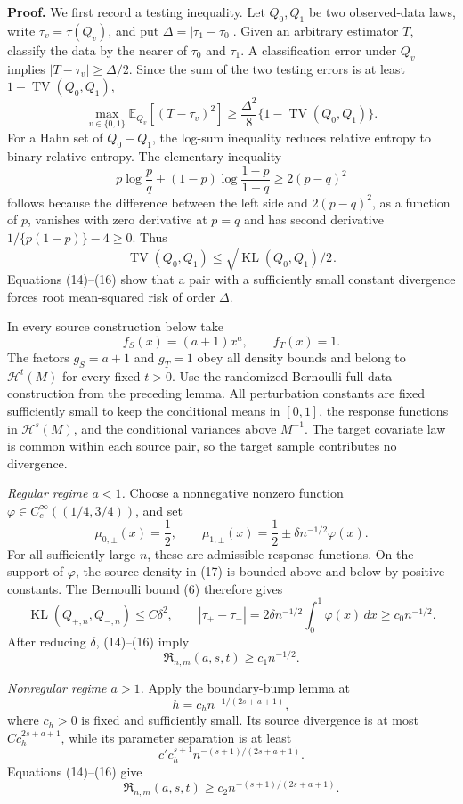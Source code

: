 \textbf{Proof.}
We first record a testing inequality.  Let \(Q_0,Q_1\) be two observed-data laws, write \(\tau_v=\tau(Q_v)\), and put \(\Delta=|\tau_1-\tau_0|\).  Given an arbitrary estimator \(T\), classify the data by the nearer of \(\tau_0\) and \(\tau_1\).  A classification error under \(Q_v\) implies \(|T-\tau_v|\ge\Delta/2\).  Since the sum of the two testing errors is at least \(1-\operatorname{TV}(Q_0,Q_1)\),
\[
\max_{v\in\{0,1\}}\mathbb E_{Q_v}[(T-\tau_v)^2]
\ge \frac{\Delta^2}{8}\{1-\operatorname{TV}(Q_0,Q_1)\}.
\tag{14}
\]
For a Hahn set of \(Q_0-Q_1\), the log-sum inequality reduces relative entropy to binary relative entropy.  The elementary inequality
\[
p\log\frac pq+(1-p)\log\frac{1-p}{1-q}\ge2(p-q)^2
\tag{15}
\]
follows because the difference between the left side and \(2(p-q)^2\), as a function of \(p\), vanishes with zero derivative at \(p=q\) and has second derivative \(1/\{p(1-p)\}-4\ge0\).  Thus
\[
\operatorname{TV}(Q_0,Q_1)
\le\sqrt{\operatorname{KL}(Q_0,Q_1)/2}.
\tag{16}
\]
Equations (14)--(16) show that a pair with a sufficiently small constant divergence forces root mean-squared risk of order \(\Delta\).

In every source construction below take
\[
f_S(x)=(a+1)x^a,
\qquad
f_T(x)=1.
\tag{17}
\]
The factors \(g_S=a+1\) and \(g_T=1\) obey all density bounds and belong to \(\mathcal H^t(M)\) for every fixed \(t>0\).  Use the randomized Bernoulli full-data construction from the preceding lemma.  All perturbation constants are fixed sufficiently small to keep the conditional means in \([0,1]\), the response functions in \(\mathcal H^s(M)\), and the conditional variances above \(M^{-1}\).  The target covariate law is common within each source pair, so the target sample contributes no divergence.

\emph{Regular regime \(a<1\).}
Choose a nonnegative nonzero function \(\varphi\in C_c^\infty((1/4,3/4))\), and set
\[
\mu_{0,\pm}(x)=\frac12,
\qquad
\mu_{1,\pm}(x)=\frac12\pm\delta n^{-1/2}\varphi(x).
\tag{18}
\]
For all sufficiently large \(n\), these are admissible response functions.  On the support of \(\varphi\), the source density in (17) is bounded above and below by positive constants.  The Bernoulli bound (6) therefore gives
\[
\operatorname{KL}(Q_{+,n},Q_{-,n})
\le C\delta^2,
\qquad
|\tau_+-\tau_-|
=2\delta n^{-1/2}\int_0^1\varphi(x)\,dx
\ge c_0n^{-1/2}.
\tag{19}
\]
After reducing \(\delta\), (14)--(16) imply
\[
\mathfrak R_{n,m}(a,s,t)\ge c_1n^{-1/2}.
\tag{20}
\]

\emph{Nonregular regime \(a>1\).}
Apply the boundary-bump lemma at
\[
h=c_hn^{-1/(2s+a+1)},
\tag{21}
\]
where \(c_h>0\) is fixed and sufficiently small.  Its source divergence is at most \(Cc_h^{2s+a+1}\), while its parameter separation is at least
\[
c'c_h^{s+1}n^{-(s+1)/(2s+a+1)}.
\tag{22}
\]
Equations (14)--(16) give
\[
\mathfrak R_{n,m}(a,s,t)
\ge c_2n^{-(s+1)/(2s+a+1)}.
\tag{23}
\]

